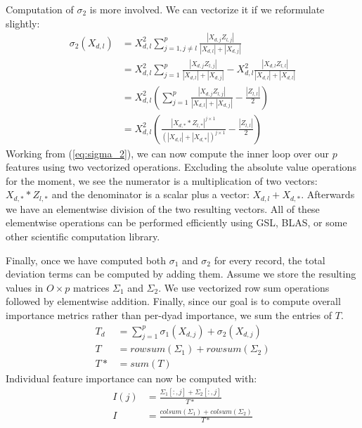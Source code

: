 \documentclass[10pt]{journal}
\begin{document}
Computation of $\sigma_2$ is more involved. We can vectorize it if we
reformulate slightly:
%
\begin{align}
    \sigma_2(X_{d,l})
        &= X_{d,l}^2 \sum_{j=1, j \neq l}^p
            \frac{|X_{d,j} Z_{l,j}|}
                 {|X_{d,l}| + |X_{d,j}|}  \\
        &= X_{d,l}^2 \sum_{j=1}^p
            \frac{|X_{d,j} Z_{l,j}|}
                 {|X_{d,l}| + |X_{d,j}|} -
             X_{d,l}^2 \frac{|X_{d,l} Z_{l,l}|}
                            {|X_{d,l}| + |X_{d,l}|}  \\
        &= X_{d,l}^2 \left(
            \sum_{j=1}^p
                \frac{|X_{d,j} Z_{l,j}|}
                     {|X_{d,l}| + |X_{d,j}|} -
            \frac{|Z_{l,l}|}{2}
        \right) \\
        &= X_{d,l}^2 \left(  \label{eq:sigma_2}
            \frac{|X_{d,*} * Z_{l,*}|^{j \times 1}}
                 {(|X_{d,l}| + |X_{d,*}|)^{j \times 1}} -
            \frac{|Z_{l,l}|}{2}
        \right)
\end{align}
%
Working from (\ref{eq:sigma_2}), we can now compute the inner loop over our $p$
features using two vectorized operations. Excluding the absolute value
operations for the moment, we see the numerator is a multiplication of
two vectors: $X_{d,*} * Z_{l, *}$ and the denominator is a scalar plus a vector:
$X_{d,l} + X_{d,*}$. Afterwards we have an elementwise division of the two
resulting vectors. All of these elementwise operations can be performed
efficiently using GSL, BLAS, or some other scientific computation library.

Finally, once we have computed both $\sigma_1$ and $\sigma_2$ for every record,
the total deviation terms can be computed by adding them. Assume we store the
resulting values in $O \times p$ matrices $\Sigma_1$ and $\Sigma_2$. We use
vectorized row sum operations followed by elementwise addition. Finally, since
our goal is to compute overall importance metrics rather than per-dyad
importance, we sum the entries of $T$.
%
\begin{align}
    T_d &= \sum_{j=1}^p \sigma_1(X_{d,j}) + \sigma_2(X_{d,j})  \\[3mm]
    T   &= rowsum(\Sigma_1) + rowsum(\Sigma_2)  \\[3mm]
    T*  &= sum(T)
\end{align}
%
Individual feature importance can now be computed with:
%
\begin{align}
    I(j) &= \frac{\Sigma_1[:, j] + \Sigma_2[:, j]}{T*}  \\[3mm]
    I    &= \frac{colsum(\Sigma_1) + colsum(\Sigma_2)}{T*}
\end{align}
%
\end{document}

